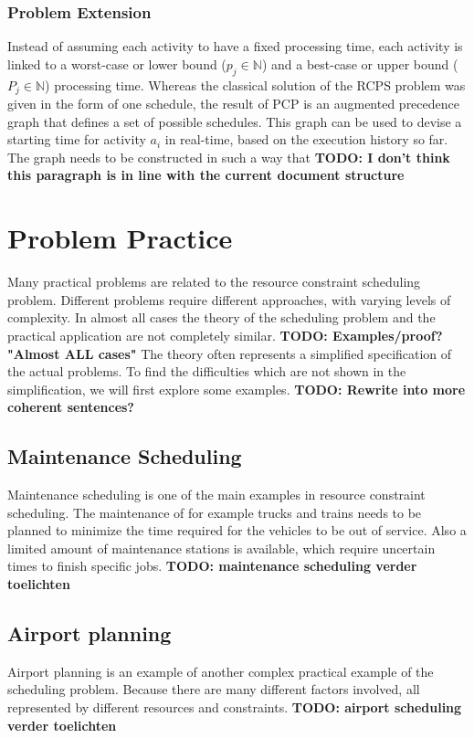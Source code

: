 \documentclass{article}
\newcommand{\TODO}[1]{{\color{red}\textbf{TODO: #1}}}
\begin{document}
\subsubsection{Problem Extension}
Instead of assuming each activity to have a fixed processing time, each activity is linked to a worst-case or lower bound ($p_{j} \in \mathbb{N}$) and a best-case or upper bound ($P_{j} \in \mathbb{N}$) processing time.
Whereas the classical solution of the RCPS problem was given in the form of one schedule, the result of PCP is an augmented precedence graph that defines a set of possible schedules.
This graph can be used to devise a starting time for activity $a_i$ in real-time, based on the execution history so far.
The graph needs to be constructed in such a way that 
\TODO{I don't think this paragraph is in line with the current document structure}
\newpage

\section{Problem Practice}
Many practical problems are related to the resource constraint scheduling problem.
Different problems require different approaches, with varying levels of complexity.
In almost all cases the theory of the scheduling problem and the practical application are not completely similar.
\TODO{Examples/proof? "Almost ALL cases"}
The theory often represents a simplified specification of the actual problems.
To find the difficulties which are not shown in the simplification, we will first explore some examples.
\TODO{Rewrite into more coherent sentences?}

\subsection{Maintenance Scheduling}
Maintenance scheduling is one of the main examples in resource constraint scheduling.
The maintenance of for example trucks and trains needs to be planned to minimize the time required for the vehicles to be out of service.
Also a limited amount of maintenance stations is available, which require uncertain times to finish specific jobs.
\TODO{maintenance scheduling verder toelichten}

\subsection{Airport planning}
Airport planning is an example of another complex practical example of the scheduling problem.
Because there are many different factors involved, all represented by different resources and constraints.
\TODO{airport scheduling verder toelichten}
\end{document}
